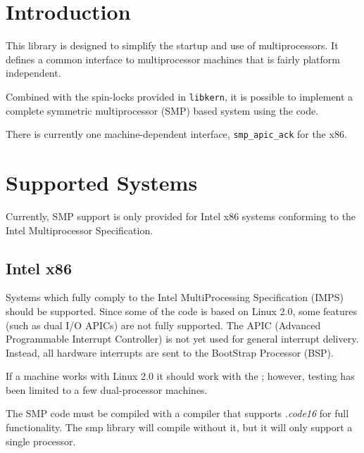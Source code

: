 %
% 
%
\label{smp}

\section{Introduction}

This library is designed to simplify the startup and use
of multiprocessors.  It defines a common interface to 
multiprocessor machines that is fairly platform independent.

Combined with the spin-locks provided in {\tt libkern},
it is possible to implement a complete symmetric multiprocessor (SMP)
based system using the \oskit{} code.

There is currently one machine-dependent interface,
{\tt smp_apic_ack} for the x86.

\section{Supported Systems}

Currently, SMP support is only provided for Intel x86
systems conforming to the Intel Multiprocessor Specification.

\subsection{Intel x86}

Systems which fully comply to the Intel MultiProcessing Specification (IMPS)
should be supported.  Since some of the code is based on Linux 2.0,
some features (such as dual I/O APICs) are not fully supported.
The APIC (Advanced Programmable Interrupt Controller)
is not yet used for general interrupt delivery.
Instead, all hardware interrupts are sent to the
BootStrap Processor (BSP).

If a machine works with 
Linux 2.0 it should work with the \oskit; however, testing
has been limited to a few dual-processor machines.

The SMP code must be compiled with a compiler that supports
\emph{.code16} for full functionality.
The smp library will compile without it,
but it will only support a single processor.

